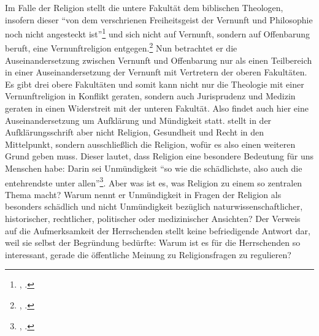 Im Falle der Religion stellt die untere Fakultät dem biblischen Theologen,
insofern dieser \enquote{von dem verschrienen Freiheitsgeist der Vernunft und
Philosophie noch nicht angesteckt
ist}\footnote{\cite[][A~18]{Kant:DerStreitderFakultaeten1977}, \cite[VII:
24.26--27]{Kant:GesammelteWerke1900ff.}.} und sich nicht auf Vernunft, sondern
auf Offenbarung beruft, eine Vernunftreligion
entgegen.\footnote{\cite[Vgl.][A~15-18]{Kant:DerStreitderFakultaeten1977},
\cite[VII: 23.9--24.30]{Kant:GesammelteWerke1900ff.}.} Nun betrachtet er
die Auseinandersetzung zwischen Vernunft und Offenbarung nur als einen
Teilbereich in einer Auseinandersetzung der Vernunft mit Vertretern der
oberen Fakultäten. Es gibt drei obere Fakultäten und somit kann nicht nur
die Theologie mit einer Vernunftreligion in Konflikt geraten, sondern auch
Jurisprudenz und Medizin geraten in einen Widerstreit mit der unteren Fakultät.
Also findet auch hier eine Auseinandersetzung um Aufklärung und Mündigkeit
statt.  stellt in der Aufklärungsschrift aber nicht
Religion, Gesundheit und Recht in den Mittelpunkt, sondern ausschließlich die Religion,
wofür es also einen weiteren Grund geben muss. Dieser lautet, dass Religion eine
besondere Bedeutung für uns Menschen habe: Darin sei Unmündigkeit \enquote{so
wie die schädlichste, also auch die entehrendste unter
allen}\footnote{\cite[Vgl.][A~492]{Kant:BeantwortungderFrage:WasistAufklaerung?1977},
\cite[VIII: 41.14--15]{Kant:GesammelteWerke1900ff.}.}. Aber was ist es, was
Religion zu einem so zentralen Thema macht? Warum nennt er Unmündigkeit in
Fragen der Religion als besonders schädlich und nicht Unmündigkeit bezüglich
naturwissenschaftlicher, historischer, rechtlicher, politischer oder
medizinischer Ansichten? Der Verweis auf die Aufmerksamkeit der Herrschenden
stellt keine befriedigende Antwort dar, weil sie selbst der Begründung bedürfte:
Warum ist es für die Herrschenden so interessant, gerade die öffentliche Meinung
zu Religionsfragen zu regulieren?

